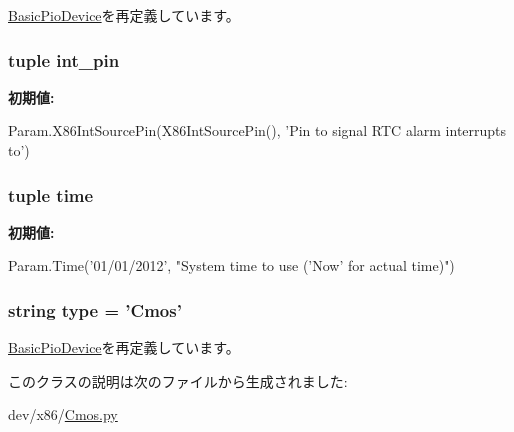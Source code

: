 \hyperlink{classDevice_1_1BasicPioDevice_a17da7064bc5c518791f0c891eff05fda}{BasicPioDevice}を再定義しています。\hypertarget{classCmos_1_1Cmos_a3e36d424287a16839b81d9c82d52c36a}{
\subsubsection[{int\_\-pin}]{\setlength{\rightskip}{0pt plus 5cm}tuple {\bf int\_\-pin}}}
\label{classCmos_1_1Cmos_a3e36d424287a16839b81d9c82d52c36a}
{\bfseries 初期値:}
\begin{DoxyCode}
Param.X86IntSourcePin(X86IntSourcePin(),
            'Pin to signal RTC alarm interrupts to')
\end{DoxyCode}
\hypertarget{classCmos_1_1Cmos_a429c35172fbcb8b1788bead147e4719b}{
\subsubsection[{time}]{\setlength{\rightskip}{0pt plus 5cm}tuple {\bf time}}}
\label{classCmos_1_1Cmos_a429c35172fbcb8b1788bead147e4719b}
{\bfseries 初期値:}
\begin{DoxyCode}
Param.Time('01/01/2012',
        "System time to use ('Now' for actual time)")
\end{DoxyCode}
\hypertarget{classCmos_1_1Cmos_acce15679d830831b0bbe8ebc2a60b2ca}{
\subsubsection[{type}]{\setlength{\rightskip}{0pt plus 5cm}string {\bf type} = '{\bf Cmos}'}}
\label{classCmos_1_1Cmos_acce15679d830831b0bbe8ebc2a60b2ca}


\hyperlink{classDevice_1_1BasicPioDevice_acce15679d830831b0bbe8ebc2a60b2ca}{BasicPioDevice}を再定義しています。

このクラスの説明は次のファイルから生成されました:\begin{DoxyCompactItemize}
\item 
dev/x86/\hyperlink{Cmos_8py}{Cmos.py}\end{DoxyCompactItemize}
